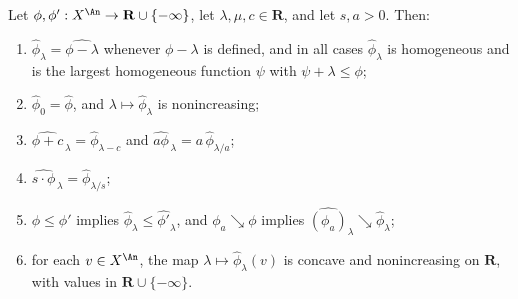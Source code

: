\begin{lemma}
\label{lem:ch35-slice-basic}
Let $\phi,\phi':X^{\An}\to\mathbf R\cup\{-\infty\}$, let
$\lambda,\mu,c\in\mathbf R$, and let $s,a>0$.  Then:
\begin{enumerate}
\item $\widehat\phi_\lambda=\widehat{\phi-\lambda}$ whenever
 $\phi-\lambda$ is defined, and in all cases
 $\widehat\phi_\lambda$ is homogeneous and is the largest homogeneous
 function $\psi$ with $\psi+\lambda\leq\phi$;
\item $\widehat\phi_0=\widehat\phi$, and $\lambda\mapsto\widehat\phi_\lambda$
 is nonincreasing;
\item $\widehat{\phi+c}_{\,\lambda}=\widehat\phi_{\lambda-c}$ and
 $\widehat{a\phi}_{\,\lambda}=a\,\widehat\phi_{\lambda/a}$;
\item $\widehat{s\cdot\phi}_{\,\lambda}=\widehat\phi_{\lambda/s}$;
\item $\phi\leq\phi'$ implies
 $\widehat\phi_\lambda\leq\widehat{\phi'}_\lambda$, and
 $\phi_a\searrow\phi$ implies
 $\widehat{(\phi_a)}_\lambda\searrow\widehat\phi_\lambda$;
\item for each $v\in X^{\An}$, the map
 $\lambda\mapsto\widehat\phi_\lambda(v)$ is concave and nonincreasing on
 $\mathbf R$, with values in $\mathbf R\cup\{-\infty\}$.
\end{enumerate}
\par
\end{lemma}

